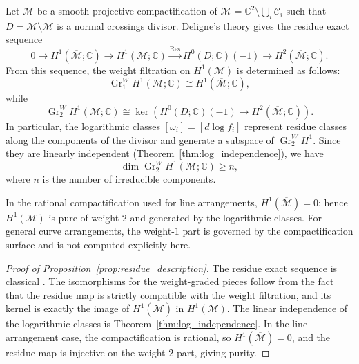 \documentclass[article,11pt]{amsart} \numberwithin{equation}{section}
\numberwithin{equation}{section}
\begin{document}
{\begin{inp}
	\label{prop:residue_description}
	Let $\overline{\mathcal M}$ be a smooth projective compactification of
	$\mathcal M=\mathbb C^2\setminus \bigcup_i \mathscr{C}_i$ such that
	$D=\overline{\mathcal M}\setminus \mathcal M$ is a normal crossings divisor.
	Deligne's theory gives the residue exact sequence
	\[
	0 \longrightarrow H^1(\overline{\mathcal M};\mathbb C)
	\longrightarrow H^1(\mathcal M;\mathbb C)
	\xrightarrow{\operatorname{Res}}
	H^0(D;\mathbb C)(-1)
	\longrightarrow H^2(\overline{\mathcal M};\mathbb C).
	\]
	From this sequence, the weight filtration on $H^1(\mathcal M)$ is determined as follows:
	\[
	\operatorname{Gr}_1^W H^1(\mathcal M;\mathbb C) \cong H^1(\overline{\mathcal M};\mathbb C),
	\]
	while
	\[
	\operatorname{Gr}_2^W H^1(\mathcal M;\mathbb C)
	\cong \ker\!\left( H^0(D;\mathbb C)(-1) \longrightarrow H^2(\overline{\mathcal M};\mathbb C) \right).
	\]
	In particular, the logarithmic classes $[\omega_i]=[d\log f_i]$ represent residue classes along the components of the divisor and generate a subspace of $\operatorname{Gr}_2^W H^1$. Since they are linearly independent (Theorem~\ref{thm:log_independence}), we have
	\[
	\dim \operatorname{Gr}_2^W H^1(\mathcal M;\mathbb C) \ge n,
	\]
	where $n$ is the number of irreducible components.
	
	In the rational compactification used for line arrangements, $H^1(\overline{\mathcal M})=0$; hence $H^1(\mathcal M)$ is pure of weight $2$ and generated by the logarithmic classes. For general curve arrangements, the weight-$1$ part is governed by the compactification surface and is not computed explicitly here.
\end{inp}

\begin{proof}[Proof of Proposition~\ref{prop:residue_description}]
	The residue exact sequence is classical \cite{Deligne71, Deligne74}. The isomorphisms for the weight-graded pieces follow from the fact that the residue map is strictly compatible with the weight filtration, and its kernel is exactly the image of $H^1(\overline{\mathcal M})$ in $H^1(\mathcal M)$. The linear independence of the logarithmic classes is Theorem~\ref{thm:log_independence}. In the line arrangement case, the compactification is rational, so $H^1(\overline{\mathcal M})=0$, and the residue map is injective on the weight-$2$ part, giving purity.
\end{proof}

}
\end{document}
